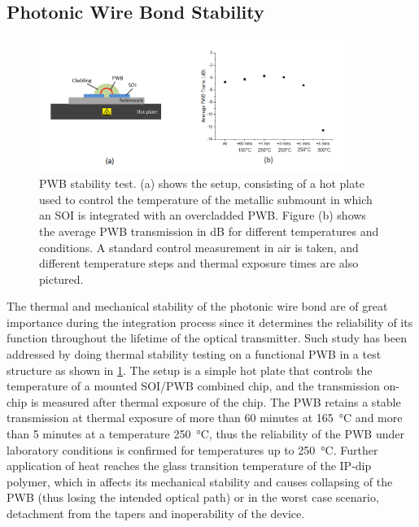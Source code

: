 \subsection{Photonic Wire Bond Stability}

\begin{figure}[!ht]
\centering
  \includegraphics[width=0.9\textwidth]{figs/PWB_stab}
  \caption{PWB stability test. (a) shows the setup, consisting of a hot plate used to control the temperature of the metallic submount in which an SOI is integrated with an overcladded PWB. Figure (b) shows the average PWB transmission in dB for different temperatures and conditions. A standard control measurement in air is taken, and different temperature steps and thermal exposure times are also pictured.}
  \label{fig:SOHtherm}
\end{figure}

The thermal and mechanical stability of the photonic wire bond are of great importance during the integration process since it determines the reliability of its function throughout the lifetime of the optical transmitter. Such study has been addressed by doing thermal stability testing on a functional PWB in a test structure as shown in \ref{fig:SOHtherm}. The setup is a simple hot plate that controls the temperature of a mounted SOI/PWB combined chip, and the transmission on-chip is measured after thermal exposure of the chip. The PWB retains a stable transmission at thermal exposure of more than 60 minutes at \SI{165}{\celsius} and more than 5 minutes at a temperature \SI{250}{\celsius}, thus the reliability of the PWB under laboratory conditions is confirmed for temperatures up to \SI{250}{\celsius}. Further application of heat reaches the glass transition temperature of the IP-dip polymer, which in affects its mechanical stability and causes collapsing of the PWB (thus losing the intended optical path) or in the worst case scenario, detachment from the tapers and inoperability of the device.




